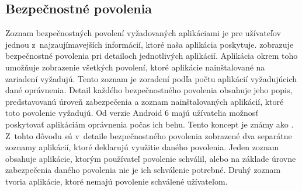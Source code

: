 \subsection{Bezpečnostné povolenia}
Zoznam bezpečnostných povolení vyžadovaných aplikáciami je pre užívateľov jednou z~najzaujímavejších informácií, ktoré naša aplikácia poskytuje.  zobrazuje bezpečnostné povolenia pri detailoch jednotlivých aplikácií. Aplikácia okrem toho umožňuje zobrazenie všetkých povolení, ktoré aplikácie nainštalované na zariadení vyžadujú. Tento zoznam je zoradení podľa počtu aplikácií vyžadujúcich dané oprávnenia. Detail každého bezpečnostného povolenia obsahuje jeho popis, predstavovanú úroveň zabezpečenia a zoznam nainštalovaných aplikácií, ktoré toto povolenie vyžadujú. Od verzie Android 6 majú užívatelia možnosť poskytovať aplikáciám oprávnenia počas ich behu. Tento koncept je známy ako . Z~tohto dôvodu sú v~detaile bezpečnostného povolenia zobrazené dva separátne zoznamy aplikácií, ktoré deklarujú využitie daného povolenia. Jeden zoznam obsahuje aplikácie, ktorým používateľ povolenie schválil, alebo na základe úrovne zabezpečenia daného povolenia nie je ich schválenie potrebné. Druhý zoznam tvoria aplikácie, ktoré nemajú povolenie schválené užívateľom.

